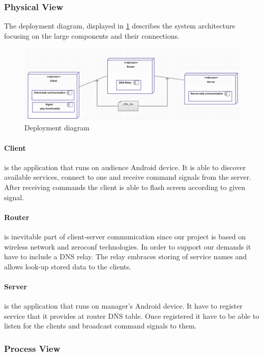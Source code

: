 \subsubsection{Physical View}
The deployment diagram, displayed in \ref{fig:deployment_diagram } describes the system architecture focusing on the large components and their connections.

\begin{figure}[!Ht]
	\centering
		\includegraphics[width=15cm]{sprint1/deploy_diagram.png}
	\caption{Deployment diagram}
	\label{fig:deployment_diagram }
\end{figure}

\paragraph{Client}
is the application that runs on audience Android device. It is able to discover available services, connect to one and receive command signals from the server. After receiving commands the client is able to flash screen according to given signal.

\paragraph{Router}
is inevitable part of client-server communication since our project is based on wireless network and zeroconf technologies. In order to support our demands it have to include a DNS relay. The relay embraces storing of service names and allows look-up stored data to the clients.

\paragraph{Server}
is the application that runs on manager's Android device. It have to register service that it provides at router DNS table. Once registered it have to be able to listen for the clients and broadcast command signals to them.

\subsubsection{Process View}

